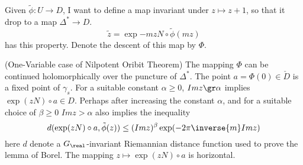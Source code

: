 \documentclass{article}
\begin{document}
Given $\tilde{\phi}: U \rightarrow D$, I want to define a map invariant under
$z \mapsto z + 1$, so that it drop to a map $\Delta^* \rightarrow D$. 
\[
    \tilde{z} = \exp{-mzN}\circ\tilde{\phi}(mz)
\]
has this property. Denote the descent of this map by $\Phi$.

\begin{theorem}(One-Variable case of Nilpotent Oribit Theorem)
The mapping $\Phi$ can be continued holomorphically over the puncture of $\Delta^*$.
The point $a = \Phi(0) \in \check{D}$ is a fixed point of $\gamma_s$. For a suitable
constant $\alpha \ge 0$, $Im z \gr \alpha$ implies $\exp(zN)\circ a \in D$.
Perhaps after increasing the constant $\alpha$, and for a suitable choice of $\beta \ge 0$
$Im z >\alpha$ also implies the inequality
\[
    d(\exp(zN)\circ a, \tilde{\phi}(z)) \le (Im z)^{\beta}\exp(-2\pi\inverse{m}Im z)
\]
here $d$ denote a $G_{\real}$-invariant Riemannian distance function used to prove 
the lemma of Borel. The mapping $z \mapsto \exp(zN)\circ a$ is horizontal.
\end{theorem}
\end{document}
